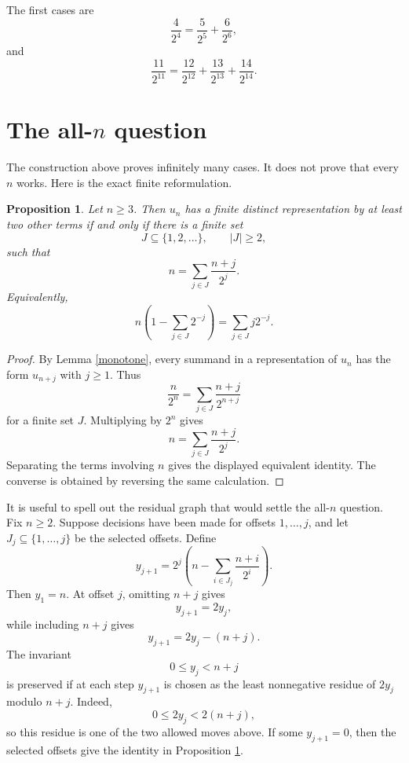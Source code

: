 \documentclass[a4paper,11pt]{amsart}
\newtheorem{proposition}{Proposition}
\begin{document}
The first cases are
\[
        \frac4{2^4}
        =
        \frac5{2^5}+\frac6{2^6},
\]
and
\[
        \frac{11}{2^{11}}
        =
        \frac{12}{2^{12}}+\frac{13}{2^{13}}+\frac{14}{2^{14}}.
\]

\section{The all-\(n\) question}

The construction above proves infinitely many cases.  It does not prove that
every \(n\) works.  Here is the exact finite reformulation.

\begin{proposition}
\label{subset-condition}
Let \(n\geq 3\).  Then \(u_n\) has a finite distinct representation by at least
two other terms if and only if there is a finite set
\[
        J\subseteq \{1,2,\ldots\},\qquad |J|\geq 2,
\]
such that
\[
        n=\sum_{j\in J}\frac{n+j}{2^j}.
\]
Equivalently,
\[
        n\left(1-\sum_{j\in J}2^{-j}\right)
        =
        \sum_{j\in J}j2^{-j}.
\]
\end{proposition}

\begin{proof}
By Lemma \ref{monotone}, every summand in a representation of \(u_n\) has the
form \(u_{n+j}\) with \(j\geq 1\).  Thus
\[
        \frac n{2^n}
        =
        \sum_{j\in J}\frac{n+j}{2^{n+j}}
\]
for a finite set \(J\).  Multiplying by \(2^n\) gives
\[
        n=\sum_{j\in J}\frac{n+j}{2^j}.
\]
Separating the terms involving \(n\) gives the displayed equivalent identity.
The converse is obtained by reversing the same calculation.
\end{proof}

It is useful to spell out the residual graph that would settle the all-\(n\)
question.  Fix \(n\geq 2\).  Suppose decisions have been made for offsets
\(1,\ldots,j\), and let \(J_j\subseteq \{1,\ldots,j\}\) be the selected
offsets.  Define
\[
        y_{j+1}
        =
        2^j\left(
        n-\sum_{i\in J_j}\frac{n+i}{2^i}
        \right).
\]
Then \(y_1=n\).  At offset \(j\), omitting \(n+j\) gives
\[
        y_{j+1}=2y_j,
\]
while including \(n+j\) gives
\[
        y_{j+1}=2y_j-(n+j).
\]
The invariant
\[
        0\leq y_j<n+j
\]
is preserved if at each step \(y_{j+1}\) is chosen as the least nonnegative
residue of \(2y_j\) modulo \(n+j\).  Indeed,
\[
        0\leq 2y_j<2(n+j),
\]
so this residue is one of the two allowed moves above.  If some \(y_{j+1}=0\),
then the selected offsets give the identity in Proposition
\ref{subset-condition}.
\end{document}

